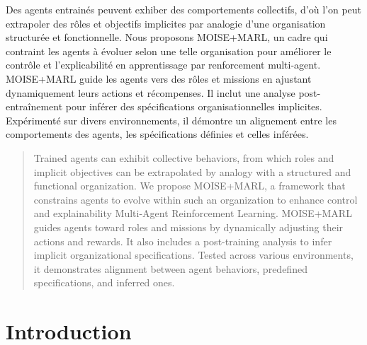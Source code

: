 \documentclass[dissemination]{jfsma}
\begin{document}
\maketitle

\begin{resume}
  Des agents entrainés peuvent exhiber des comportements collectifs, d’où l’on peut extrapoler des rôles et objectifs implicites par analogie d'une organisation structurée et fonctionnelle. Nous proposons MOISE+MARL, un cadre qui contraint les agents à évoluer selon une telle organisation pour améliorer le contrôle et l’explicabilité en apprentissage par renforcement multi-agent.
  MOISE+MARL guide les agents vers des rôles et missions en ajustant dynamiquement leurs actions et récompenses. Il inclut une analyse post-entraînement pour inférer des spécifications organisationnelles implicites. Expérimenté sur divers environnements, il démontre un alignement entre les comportements des agents, les spécifications définies et celles inférées.
\end{resume}



\begin{abstract}
  Trained agents can exhibit collective behaviors, from which roles and implicit objectives can be extrapolated by analogy with a structured and functional organization. We propose MOISE+MARL, a framework that constrains agents to evolve within such an organization to enhance control and explainability Multi-Agent Reinforcement Learning.
  MOISE+MARL guides agents toward roles and missions by dynamically adjusting their actions and rewards. It also includes a post-training analysis to infer implicit organizational specifications. Tested across various environments, it demonstrates alignment between agent behaviors, predefined specifications, and inferred ones.
\end{abstract}



\section{Introduction}

\end{document}
